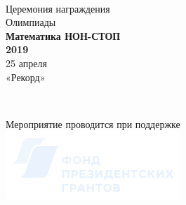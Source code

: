 \newpage
\ \vspace{-0.4cm}

\begin{center}
	\large Церемония награждения \\
	Олимпиады \\ [0.6cm]
	{\bf Математика НОН-СТОП \\ 2019 \\ [0.8cm]}
	{\normalsize 25 апреля \\ «Рекорд» \\}
\end{center}

\newpage
\ \vspace{-0.65cm}

\begin{center}
	Мероприятие проводится при поддержке \\ [1.25cm]
	\includegraphics[scale=1.45]{fpg_av/fpg}
\end{center}

\def\slovo#1#2{
\newpage
\begin{center}
	{\bf Слово предоставляется} \\ \vspace{1.1cm}
	\begin{tabular}{|C{7.6cm}|}
	\hline
		\makecell{\ \vspace{-0.3cm} \\ #1 \vspace{0.4cm}} \\
	\hline
		\makecell{\ \vspace{-0.3cm} \\ \bf\Large #2 \vspace{0.4cm}} \\
	\hline
	\end{tabular}
\end{center}
}

